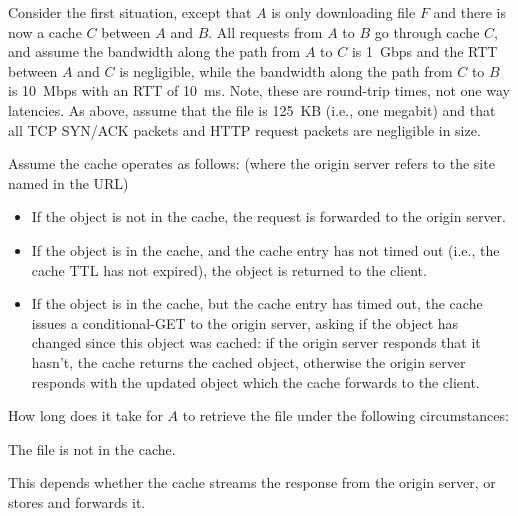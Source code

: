 \documentclass{supervision}
\begin{document}
\begin{questions}
\begin{parts}
\begin{subparts}
\begin{subsubparts}
            \end{subsubparts}

          \subpart Consider the first situation, except that $A$ is only
            downloading file $F$ and there is now a cache $C$ between $A$ and
            $B$. All requests from $A$ to $B$ go through cache $C$, and assume
            the bandwidth along the path from $A$ to $C$ is \SI{1}{Gbps} and
            the RTT between $A$ and $C$ is negligible, while the bandwidth
            along the path from $C$ to $B$ is \SI{10}{Mbps} with an RTT of
            \SI{10}{ms}. Note, these are round-trip times, not one way
            latencies. As above, assume that the file is \SI{125}{KB} (i.e.,
            one megabit) and that all TCP SYN/ACK packets and HTTP request
            packets are negligible in size.

            Assume the cache operates as follows: (where the origin server
            refers to the site named in the URL)

            \begin{itemize}
              \item If the object is not in the cache, the request is forwarded
                to the origin server.

              \item If the object is in the cache, and the cache entry has not
                timed out (i.e., the cache TTL has not expired), the object is
                returned to the client.

              \item If the object is in the cache, but the cache entry has
                timed out, the cache issues a conditional-GET to the origin
                server, asking if the object has changed since this object was
                cached: if the origin server responds that it hasn't, the cache
                returns the cached object, otherwise the origin server responds
                with the updated object which the cache forwards to the client.

            \end{itemize}

            How long does it take for $A$ to retrieve the file under the
            following circumstances:

            \begin{subsubparts}
              \subsubpart The file is not in the cache.
                \begin{solution}
                  This depends whether the cache streams the response from the
                  origin server, or stores and forwards it.


\end{solution}
\end{subsubparts}
\end{subparts}
\end{parts}
\end{questions}
\end{document}
